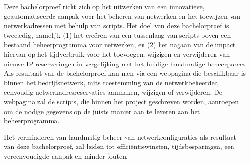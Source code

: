 \documentclass[dutch,dit,thesis]{hogentreport}
\begin{document}
Deze bachelorproef richt zich op het uitwerken van een innovatieve, geautomatiseerde aanpak voor het beheren van netwerken en het
toewijzen van netwerkadressen met behulp van scripts. 
Het doel van deze bachelorproef is tweeledig, namelijk (1) het creëren van een tussenlaag van scripts boven een bestaand beheerprogramma voor netwerken, en (2) het nagaan van de impact hiervan op het tijdverbruik voor het toevoegen, wijzigen en verwijderen van nieuwe IP-reserveringen in vergelijking met het huidige handmatige beheerproces. Als resultaat van de bachelorproef kan men via een webpagina die beschikbaar is binnen het bedrijfsnetwerk, mits toestemming van de netwerkbeheerder, eenvoudig netwerkadresreservaties aanmaken, wijzigen of verwijderen.
De webpagina zal de scripts, die binnen het project geschreven worden, aanroepen om de nodige gegevens op de juiste manier aan te leveren aan het beheerprogramma. 

Het verminderen van handmatig beheer van netwerkconfiguraties als resultaat van deze bachelorproef, zal leiden tot efficiëntiewinsten, tijdsbesparingen, een vereenvoudigde aanpak en minder fouten.






\backmatter{}

\setlength\bibitemsep{2pt} %
\printbibliography[heading=bibintoc]
\end{document}

